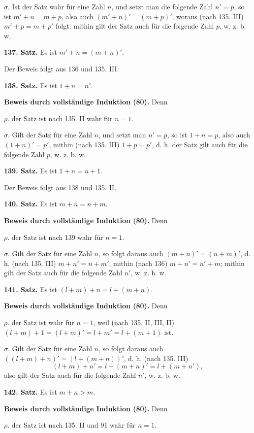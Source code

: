\documentclass[11pt]{article}
\begin{document}
\noindent $\sigma.$ Ist der Satz wahr für eine Zahl $n$, und setzt man die folgende Zahl $n'=p$, so ist $m'+n=m+p$, also auch $(m'+n)'=(m+p)'$, woraus (nach 135. III) $m'+p=m+p'$ folgt; mithin gilt der Satz auch für die folgende Zahl $p$, w. z. b. w.

\noindent\textbf{137. Satz.} Es ist $m'+n=(m+n)'$.

Der Beweis folgt aus 136 und 135. III.

\noindent\textbf{138. Satz.} Es ist $1+n=n'$.

\noindent\textbf{Beweis durch vollständige Induktion (80).} Denn

\noindent $\rho.$ der Satz ist nach 135. II wahr für $n=1$.

\noindent $\sigma.$ Gilt der Satz für eine Zahl $n$, und setzt man $n'=p$, so ist $1+n=p$, also auch $(1+n)'=p'$, mithin (nach 135. III) $1+p=p'$, d. h. der Satz gilt auch für die folgende Zahl $p$, w. z. b. w.

\noindent\textbf{139. Satz.} Es ist $1+n=n+1$.

Der Beweis folgt aus 138 und 135. II.

\noindent\textbf{140. Satz.} Es ist $m+n=n+m$.

\noindent\textbf{Beweis durch vollständige Induktion (80).} Denn

\noindent $\rho.$ der Satz ist nach 139 wahr für $n=1$.

\noindent $\sigma.$ Gilt der Satz für eine Zahl $n$, so folgt daraus auch $(m+n)'=(n+m)'$, d. h. (nach 135. III) $m+n'=n+m'$, mithin (nach 136) $m+n'=n'+m$; mithin gilt der Satz auch für die folgende Zahl $n'$, w. z. b. w.

\noindent\textbf{141. Satz.} Es ist $(l+m)+n=l+(m+n)$.

\noindent\textbf{Beweis durch vollständige Induktion (80).} Denn

\noindent $\rho.$ der Satz ist wahr für $n=1$, weil (nach 135. II, III, II) $(l+m)+1=(l+m)'=l+m'=l+(m+1)$ ist.

\noindent $\sigma.$ Gilt der Satz für eine Zahl $n$, so folgt daraus auch $((l+m)+n)'=(l+(m+n))'$, d. h. (nach 135. III)
\[
(l+m)+n'=l+(m+n)'=l+(m+n'),
\]
also gilt der Satz auch für die folgende Zahl $n'$, w. z. b. w.

\noindent\textbf{142. Satz.} Es ist $m+n>m$.

\noindent\textbf{Beweis durch vollständige Induktion (80).} Denn

\noindent $\rho.$ der Satz ist nach 135. II und 91 wahr für $n=1$.
\end{document}
